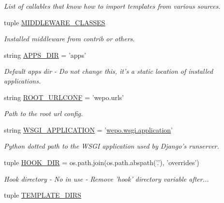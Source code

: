 \begin{DoxyCompactItemize}
\begin{DoxyCompactList}\small\item\em List of callables that know how to import templates from various sources. \end{DoxyCompactList}\item 
tuple \hyperlink{namespacewepo_1_1settings_aff501e73353b60e2ccf464b01e342bc7}{M\-I\-D\-D\-L\-E\-W\-A\-R\-E\-\_\-\-C\-L\-A\-S\-S\-E\-S}
\begin{DoxyCompactList}\small\item\em Installed middleware from contrib or others. \end{DoxyCompactList}\item 
string \hyperlink{namespacewepo_1_1settings_aa72b0a269f252e5fd99fd29f6fa09db0}{A\-P\-P\-S\-\_\-\-D\-I\-R} = 'apps'
\begin{DoxyCompactList}\small\item\em Default apps dir -\/ Do not change this, it's a static location of installed applications. \end{DoxyCompactList}\item 
string \hyperlink{namespacewepo_1_1settings_ab1e513db5bb04f174572009893ecc447}{R\-O\-O\-T\-\_\-\-U\-R\-L\-C\-O\-N\-F} = 'wepo.\-urls'
\begin{DoxyCompactList}\small\item\em Path to the root url config. \end{DoxyCompactList}\item 
string \hyperlink{namespacewepo_1_1settings_aaa11b47894bdc61fd4ecfb02a1aeb72c}{W\-S\-G\-I\-\_\-\-A\-P\-P\-L\-I\-C\-A\-T\-I\-O\-N} = '\hyperlink{namespacewepo_1_1wsgi_aecec5f351e7bfcfba14194127f1ee8d3}{wepo.\-wsgi.\-application}'
\begin{DoxyCompactList}\small\item\em Python dotted path to the W\-S\-G\-I application used by Django's runserver. \end{DoxyCompactList}\item 
tuple \hyperlink{namespacewepo_1_1settings_a12c49fe52d22d2119e0d8e8c687f9189}{H\-O\-O\-K\-\_\-\-D\-I\-R} = os.\-path.\-join(os.\-path.\-abspath('.'), 'overrides')
\begin{DoxyCompactList}\small\item\em Hook directory -\/ No in use  -\/ Remove 'hook' directory variable after... \end{DoxyCompactList}\item 
tuple \hyperlink{namespacewepo_1_1settings_a4cd3f2ad4c57d4a726db437cccd99a71}{T\-E\-M\-P\-L\-A\-T\-E\-\_\-\-D\-I\-R\-S}

\end{DoxyCompactItemize}
